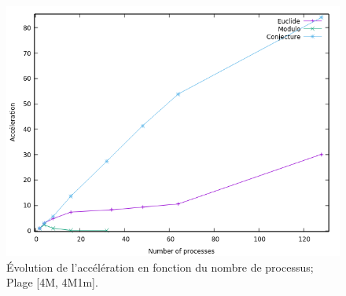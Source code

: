 	\begin{frame}
	\begin{figure}[!ht]	
		\begin{center}\includegraphics[scale=0.55]{Acc_All_4M.png}\end{center}
		\caption{Évolution de l’accélération en fonction du nombre de processus; Plage [4M, 4M1m].}
		\label{fg:fig4}
	\end{figure}	
	\end{frame}
	
